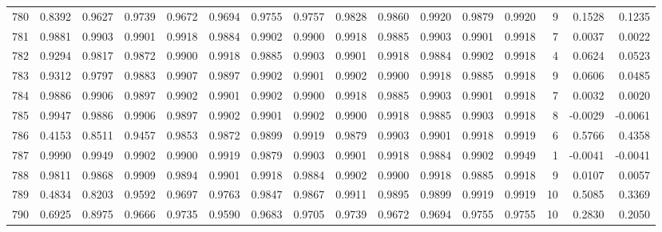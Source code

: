 \begin{tabular}{lrrrrrrrrrrrrrrr}
780 &      0.8392 &  0.9627 &  0.9739 &  0.9672 &  0.9694 &  0.9755 &  0.9757 &  0.9828 &  0.9860 &  0.9920 &   0.9879 &     0.9920 &      9 &                    0.1528 &                     0.1235 \\
781 &      0.9881 &  0.9903 &  0.9901 &  0.9918 &  0.9884 &  0.9902 &  0.9900 &  0.9918 &  0.9885 &  0.9903 &   0.9901 &     0.9918 &      7 &                    0.0037 &                     0.0022 \\
782 &      0.9294 &  0.9817 &  0.9872 &  0.9900 &  0.9918 &  0.9885 &  0.9903 &  0.9901 &  0.9918 &  0.9884 &   0.9902 &     0.9918 &      4 &                    0.0624 &                     0.0523 \\
783 &      0.9312 &  0.9797 &  0.9883 &  0.9907 &  0.9897 &  0.9902 &  0.9901 &  0.9902 &  0.9900 &  0.9918 &   0.9885 &     0.9918 &      9 &                    0.0606 &                     0.0485 \\
784 &      0.9886 &  0.9906 &  0.9897 &  0.9902 &  0.9901 &  0.9902 &  0.9900 &  0.9918 &  0.9885 &  0.9903 &   0.9901 &     0.9918 &      7 &                    0.0032 &                     0.0020 \\
785 &      0.9947 &  0.9886 &  0.9906 &  0.9897 &  0.9902 &  0.9901 &  0.9902 &  0.9900 &  0.9918 &  0.9885 &   0.9903 &     0.9918 &      8 &                   -0.0029 &                    -0.0061 \\
786 &      0.4153 &  0.8511 &  0.9457 &  0.9853 &  0.9872 &  0.9899 &  0.9919 &  0.9879 &  0.9903 &  0.9901 &   0.9918 &     0.9919 &      6 &                    0.5766 &                     0.4358 \\
787 &      0.9990 &  0.9949 &  0.9902 &  0.9900 &  0.9919 &  0.9879 &  0.9903 &  0.9901 &  0.9918 &  0.9884 &   0.9902 &     0.9949 &      1 &                   -0.0041 &                    -0.0041 \\
788 &      0.9811 &  0.9868 &  0.9909 &  0.9894 &  0.9901 &  0.9918 &  0.9884 &  0.9902 &  0.9900 &  0.9918 &   0.9885 &     0.9918 &      9 &                    0.0107 &                     0.0057 \\
789 &      0.4834 &  0.8203 &  0.9592 &  0.9697 &  0.9763 &  0.9847 &  0.9867 &  0.9911 &  0.9895 &  0.9899 &   0.9919 &     0.9919 &     10 &                    0.5085 &                     0.3369 \\
790 &      0.6925 &  0.8975 &  0.9666 &  0.9735 &  0.9590 &  0.9683 &  0.9705 &  0.9739 &  0.9672 &  0.9694 &   0.9755 &     0.9755 &     10 &                    0.2830 &                     0.2050 \\

\end{tabular}
